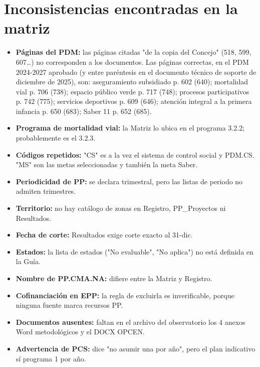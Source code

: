 \documentclass[11pt,letterpaper]{article}
\begin{document}
\section{Inconsistencias encontradas en la matriz}

\begin{itemize}

\item \textbf{Páginas del PDM:} las páginas citadas "de la copia del Concejo" (518, 599, 607\ldots{}) no corresponden a los documentos. Las páginas correctas, en el PDM 2024-2027 aprobado (y entre paréntesis en el documento técnico de soporte de diciembre de 2025), son: aseguramiento subsidiado p. 602 (640); mortalidad vial p. 706 (738); espacio público verde p. 717 (748); procesos participativos p. 742 (775); servicios deportivos p. 609 (646); atención integral a la primera infancia p. 650 (683); Saber 11 p. 652 (685).

\item \textbf{Programa de mortalidad vial:} la Matriz lo ubica en el programa 3.2.2; probablemente es el 3.2.3.

\item \textbf{Códigos repetidos:} "CS" es a la vez el sistema de control social y PDM.CS. "MS" son las metas seleccionadas y también la meta Saber.

\item \textbf{Periodicidad de PP:} se declara trimestral, pero las listas de periodo no admiten trimestres.

\item \textbf{Territorio:} no hay catálogo de zonas en Registro, PP\_Proyectos ni Resultados.

\item \textbf{Fecha de corte:} Resultados exige corte exacto al 31-dic.

\item \textbf{Estados:} la lista de estados ("No evaluable", "No aplica") no está definida en la Guía.

\item \textbf{Nombre de PP.CMA.NA:} difiere entre la Matriz y Registro.

\item \textbf{Cofinanciación en EPP:} la regla de excluirla es inverificable, porque ninguna fuente marca recursos PP.

\item \textbf{Documentos ausentes:} faltan en el archivo del observatorio los 4 anexos Word metodológicos y el DOCX OPCEN.

\item \textbf{Advertencia de PCS:} dice "no asumir una por año", pero el plan indicativo sí programa 1 por año.

\end{itemize}
\end{document}
